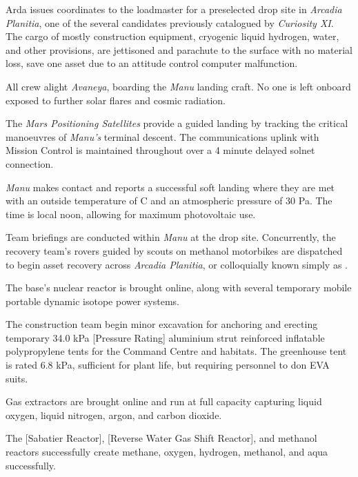Arda issues coordinates to the loadmaster for a preselected drop site in {\it Arcadia Planitia}, one of the several candidates previously catalogued by {\it Curiosity XI}. The cargo of mostly construction equipment, cryogenic liquid hydrogen, water, and other provisions, are jettisoned and parachute to the surface with no material loss, save one asset due to an attitude control computer malfunction.
\StopTimelineDate

All crew alight {\it Avaneya}, boarding the {\it Manu} landing craft. No one is left onboard exposed to further solar flares and cosmic radiation.

The {\it Mars Positioning Satellites} provide a guided landing by tracking the critical manoeuvres of {\it Manu's} terminal descent. The communications uplink with Mission Control is maintained throughout over a 4 minute delayed solnet connection.

{\it Manu} makes contact and reports a successful soft landing where they are met with an outside temperature of C and an atmospheric pressure of 30 Pa. The time is local noon, allowing for maximum photovoltaic use.

Team briefings are conducted within {\it Manu} at the drop site. Concurrently, the recovery team's rovers guided by scouts on methanol motorbikes are dispatched to begin asset recovery across {\it Arcadia Planitia}, or colloquially known simply as .

The base's nuclear reactor is brought online, along with several temporary mobile portable dynamic isotope power systems.

The construction team begin minor excavation for anchoring and erecting temporary 34.0 kPa [Pressure Rating] aluminium strut reinforced inflatable polypropylene tents for the Command Centre and habitats. The greenhouse tent is rated 6.8 kPa, sufficient for plant life, but requiring personnel to don EVA suits.
\StopTimelineDate

Gas extractors are brought online and run at full capacity capturing liquid oxygen, liquid nitrogen, argon, and carbon dioxide. 

The [Sabatier Reactor], [Reverse Water Gas Shift Reactor], and methanol reactors successfully create methane, oxygen, hydrogen, methanol, and aqua successfully.
\StopTimelineDate

